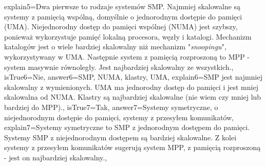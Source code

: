\begin{enumerate}
\begin{minipage}{\textwidth}
{		explain5={Dwa pierwsze to rodzaje systemów SMP. Najmniej skalowalne są systemy z pamięcią wspólną, domyślnie o jednorodnym dostępie do pamięci (UMA). Niejednorodny dostęp do pamięci wspólnej (NUMA) jest szybszy, ponieważ wykorzystuje pamięć lokalną procesora, węzły i katalogi. Mechanizm katalogów jest o wiele bardziej skalowalny niż mechanizm "\emph{snoopingu}", wykorzystywany w UMA. Następnie system z pamięcią rozproszoną to MPP - system masywnie równoległy. Jest najbardziej skalowalny ze wszystkich.}, %
		isTrue6={Nie}, %
		answer6={SMP, NUMA, klastry, UMA}, %
		explain6={SMP jest najmniej skalowalny z wymienionych. UMA ma jednorodny dostęp do pamięci i jest mniej skalowalna od NUMA. Klastry są najbardziej skalowalne (nie wiem czy mniej lub bardziej do MPP).}, %
		isTrue7={Tak}, %
		answer7={Systemy symetryczne, o niejednorodnym dostępie do pamięci, systemy z przesyłem komunikatów}, %
		explain7={Systemy symetryczne to SMP z jednorodnym dostępem do pamięci. Systemy SMP z niejednorodnym dostępem są bardziej skalowalne. Z kolei systemy z przesyłem komunikatów sugerują system MPP, z pamięcią rozproszoną - jest on najbardziej skalowalny.}, %
	}
\end{minipage}
\begin{minipage}{\textwidth}
\end{minipage}
\end{enumerate}